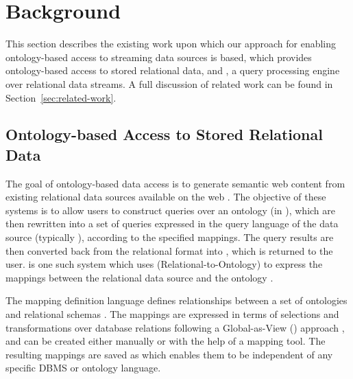 
\section{Background}
\label{sec:background}

This section describes the existing work upon which our approach for enabling ontology-based access to streaming data sources is based, \viz \rtwoo which provides ontology-based access to stored relational data, and \snee, a query processing engine over relational data streams.
A full discussion of related work can be found in Section~\ref{sec:related-work}.


\subsection{Ontology-based Access to Stored Relational Data}
\label{sec:ontol-based-access-stored}

The goal of ontology-based data access is to generate semantic web content from existing relational data sources available on the web \cite{Sahoo_09}.
The objective of these systems is to allow users to construct queries over an ontology (\eg in \sparql), which are then rewritten into a set of queries expressed in the query language of the data source (typically \sql), according to the specified mappings.
The query results are then converted back from the relational format into \rdf, which is returned to the user.
\odemapster is one such system which uses \rtwoo (Relational-to-Ontology) to express the mappings between the relational data source and the ontology \cite{Barrasa_04}.

The mapping definition language \rtwoo defines relationships between a set of ontologies and relational schemas \cite{Barrasa_04}.
The mappings are expressed in terms of selections and transformations over database relations following a Global-as-View (\gav) approach \cite{Lenzerini_02}, and can be created either manually or with the help of a mapping tool.
The resulting mappings are saved as \xml which enables them to be independent of any specific DBMS or ontology language.

